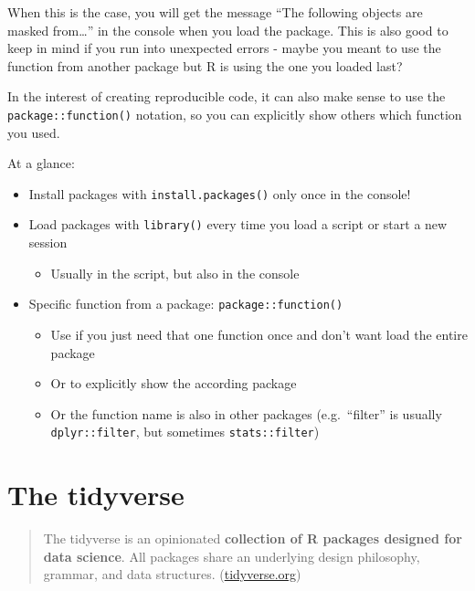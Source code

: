 \documentclass[
]{book}
\providecommand{\tightlist}{%
  \setlength{\itemsep}{0pt}\setlength{\parskip}{0pt}}
\begin{document}
When this is the case, you will get the message ``The following objects are masked from\ldots{}'' in the console when you load the package. This is also good to keep in mind if you run into unexpected errors - maybe you meant to use the function from another package but R is using the one you loaded last?

In the interest of creating reproducible code, it can also make sense to use the \texttt{package::function()} notation, so you can explicitly show others which function you used.

At a glance:

\begin{itemize}
\tightlist
\item
  Install packages with \texttt{install.packages()} only once in the console!
\item
  Load packages with \texttt{library()} every time you load a script or start a new session

  \begin{itemize}
  \tightlist
  \item
    Usually in the script, but also in the console
  \end{itemize}
\item
  Specific function from a package: \texttt{package::function()}

  \begin{itemize}
  \tightlist
  \item
    Use if you just need that one function once and don't want load the entire package
  \item
    Or to explicitly show the according package
  \item
    Or the function name is also in other packages (e.g.~``filter'' is usually \texttt{dplyr::filter}, but sometimes \texttt{stats::filter})
  \end{itemize}
\end{itemize}

\section{The tidyverse}\label{the-tidyverse}

\begin{quote}
The tidyverse is an opinionated \textbf{collection of R packages designed for data science}. All packages share an underlying design philosophy, grammar, and data structures. (\url{tidyverse.org})
\end{quote}
\end{document}
